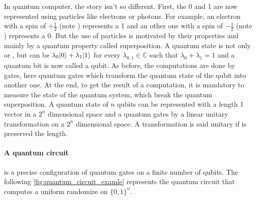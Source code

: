 In quantum computer, the story isn't so different. First, the 0 and 1 are
now represented using particles like electrons or photons. For example,
an electron with a spin of $+\frac{1}{2}$ (note ) represents a 1 and
an other one with a spin of $-\frac{1}{2}$ (note ) represents a 0.
But the use of particles is motivated by their properties and mainly by
a quantum property called superposition. A quantum state is not only 
or , but can be $\lambda_0 |0\rangle + \lambda_1 |1\rangle$ for every
$\lambda_{0, 1} \in \mathbb{C}$ such that $\lambda_0+\lambda_1=1$ and a quantum
bit is now called a qubit. As before, the computations are done by gates, here
quantum gates which transform the quantum state of the qubit into another one.
At the end, to get the result of a computation, it is mandatory to measure the
state of the quantum system, which break the quantum superposition. A quantum
state of $n$ qubits can be represented with a length 1 vector in a $2^n$
dimensional space and a quantum gates by a linear unitary transformation
on a $2^n$ dimensional space. A transformation is said unitary if is preserved
the length.

\paragraph*{A quantum circuit} is a precise configuration of quantum gates
on a finite number of qubits. The following \autoref{fig:quantum_circuit_examle} represents the quantum
circuit that computes a uniform randomize on $\{0, 1\}^n$.


